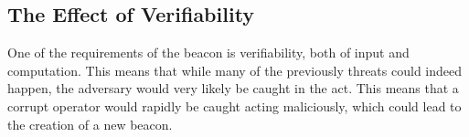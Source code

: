 \subsection{The Effect of Verifiability}
One of the requirements of the beacon is verifiability, both of input and computation. This means that while many of the previously threats could indeed happen, the adversary would very likely be caught in the act. This means that a corrupt operator would rapidly be caught acting maliciously, which could lead to the creation of a new beacon.